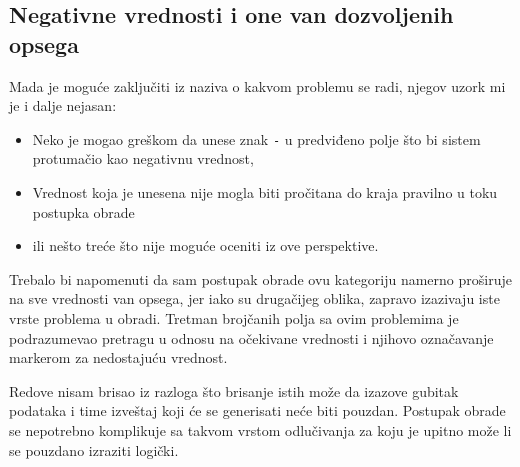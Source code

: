 \documentclass[a4paper,12pt]{article}
\begin{document}
    \subsection*{Negativne vrednosti i one van dozvoljenih opsega}

    Mada je moguće zaključiti iz naziva o kakvom problemu se radi, njegov uzork mi je i dalje nejasan:
    \begin{itemize}
        \item {Neko je mogao greškom da unese znak \verb|-| u predviđeno polje što bi sistem protumačio kao negativnu vrednost,}
        \item {Vrednost koja je unesena nije mogla biti pročitana do kraja pravilno u toku postupka obrade}
        \item {ili nešto treće što nije moguće oceniti iz ove perspektive.}
    \end{itemize}

    Trebalo bi napomenuti da sam postupak obrade ovu kategoriju namerno proširuje na sve vrednosti van opsega,
    jer iako su drugačijeg oblika, zapravo izazivaju iste vrste problema u obradi. Tretman brojčanih polja sa ovim
    problemima je podrazumevao pretragu u odnosu na očekivane vrednosti i njihovo označavanje markerom za nedostajuću vrednost.

    Redove nisam brisao iz razloga što brisanje istih može da izazove gubitak podataka i time izveštaj koji će se generisati neće biti pouzdan. Postupak
    obrade se nepotrebno komplikuje sa takvom vrstom odlučivanja za koju je upitno može li se pouzdano izraziti logički.

        \newpage
\end{document}
